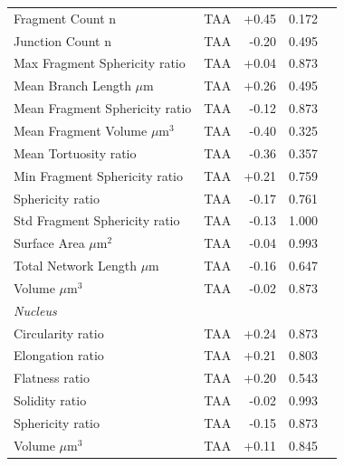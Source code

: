\documentclass[11pt,a4paper]{article}
\begin{document}
\begin{longtable}{llrrr}
  Fragment Count n & TAA & +0.45 & 0.172 &  \\
  Junction Count n & TAA & -0.20 & 0.495 &  \\
  Max Fragment Sphericity ratio & TAA & +0.04 & 0.873 &  \\
  Mean Branch Length $\mu$m & TAA & +0.26 & 0.495 &  \\
  Mean Fragment Sphericity ratio & TAA & -0.12 & 0.873 &  \\
  Mean Fragment Volume $\mu$m$^{3}$ & TAA & -0.40 & 0.325 &  \\
  Mean Tortuosity ratio & TAA & -0.36 & 0.357 &  \\
  Min Fragment Sphericity ratio & TAA & +0.21 & 0.759 &  \\
  Sphericity ratio & TAA & -0.17 & 0.761 &  \\
  Std Fragment Sphericity ratio & TAA & -0.13 & 1.000 &  \\
  Surface Area $\mu$m$^{2}$ & TAA & -0.04 & 0.993 &  \\
  Total Network Length $\mu$m & TAA & -0.16 & 0.647 &  \\
  Volume $\mu$m$^{3}$ & TAA & -0.02 & 0.873 &  \\
\midrule
\multicolumn{5}{l}{\textit{Nucleus}} \\
  Circularity ratio & TAA & +0.24 & 0.873 &  \\
  Elongation ratio & TAA & +0.21 & 0.803 &  \\
  Flatness ratio & TAA & +0.20 & 0.543 &  \\
  Solidity ratio & TAA & -0.02 & 0.993 &  \\
  Sphericity ratio & TAA & -0.15 & 0.873 &  \\
  Volume $\mu$m$^{3}$ & TAA & +0.11 & 0.845 &  \\
\bottomrule
\end{longtable}
\end{document}
